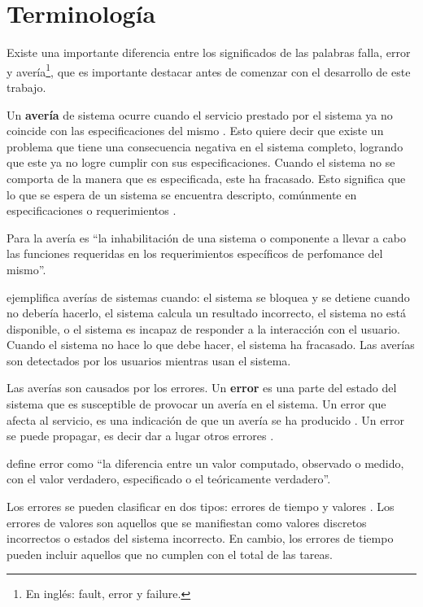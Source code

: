 \section{Terminología}\label{sec:terminologia}
Existe una importante diferencia entre los significados de las palabras falla, error y
avería\footnote{En inglés: fault, error y failure.}, que es importante destacar antes de comenzar
con el desarrollo de este trabajo.

Un \textbf{avería} de sistema ocurre cuando el servicio prestado por el sistema ya no coincide con
las especificaciones del mismo \citep{Hanmer07}. Esto quiere decir que existe un problema que tiene
una consecuencia negativa en el sistema completo, logrando que este ya no logre cumplir con sus
especificaciones. Cuando el sistema no se comporta de la manera que es especificada, este ha
fracasado. Esto significa que lo que se espera de un sistema se encuentra descripto, comúnmente en
especificaciones o requerimientos \citep{Pullum01}.

Para la \cite{IEEE610.12} avería es ``la inhabilitación de una sistema o componente a llevar a
cabo las funciones requeridas en los requerimientos específicos de perfomance del mismo''.

\cite{Hanmer07} ejemplifica averías de sistemas cuando: el sistema se bloquea y se detiene cuando no
debería hacerlo, el sistema calcula un resultado incorrecto, el sistema no está disponible, o el
sistema es incapaz de responder a la interacción con el usuario. Cuando el sistema no hace lo que
debe hacer, el sistema ha fracasado. Las averías son detectados por los usuarios mientras usan el
sistema.

Las averías son causados por los errores. Un \textbf{error} es una parte del estado del sistema
que es susceptible de provocar un avería en el sistema. Un error que afecta al servicio, es una
indicación de que un avería se ha producido \citep{Hanmer07}. Un error se puede propagar, es decir
dar a lugar otros errores \citep{Pullum01}.

\cite{IEEE610.12} define error como ``la diferencia entre un valor computado, observado o medido,
con el valor verdadero, especificado o el teóricamente verdadero''.

Los errores se pueden clasificar en dos tipos: errores de tiempo y valores \citep{Hanmer07}. Los
errores de valores son aquellos que se manifiestan como valores discretos incorrectos o estados del
sistema incorrecto. En cambio, los errores de tiempo pueden incluir aquellos que no cumplen con el total de las tareas.

